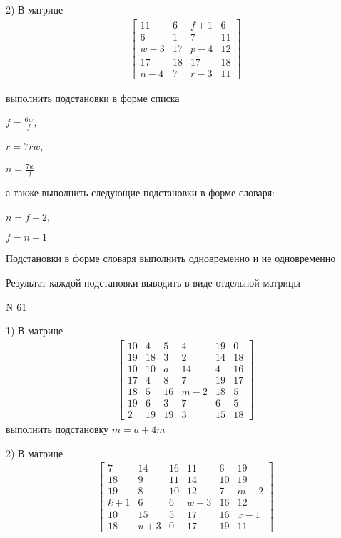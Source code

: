 \documentclass[11pt]{report}
\begin{document}
    2) В матрице
\begin{align*}
\left[\begin{matrix}11 & 6 & f + 1 & 6\\6 & 1 & 7 & 11\\w - 3 & 17 & p - 4 & 12\\17 & 18 & 17 & 18\\n - 4 & 7 & r - 3 & 11\end{matrix}\right]
\end{align*}

выполнить подстановки в форме списка

$f=\frac{6 w}{f}$,

$r=7 r w$,

$n=\frac{7 w}{f}$

а также выполнить следующие подстановки в форме словаря:

$n=f + 2$,

$f=n + 1$


    Подстановки в форме словаря выполнить одновременно и не одновременно


    Результат каждой подстановки выводить в виде отдельной матрицы

\newpage
N 61


    1) В матрице
\begin{align*}
\left[\begin{matrix}10 & 4 & 5 & 4 & 19 & 0\\19 & 18 & 3 & 2 & 14 & 18\\10 & 10 & a & 14 & 4 & 16\\17 & 4 & 8 & 7 & 19 & 17\\18 & 5 & 16 & m - 2 & 18 & 5\\19 & 6 & 3 & 7 & 6 & 5\\2 & 19 & 19 & 3 & 15 & 18\end{matrix}\right]
\end{align*}
выполнить подстановку $m=a + 4 m$


    2) В матрице
\begin{align*}
\left[\begin{matrix}7 & 14 & 16 & 11 & 6 & 19\\18 & 9 & 11 & 14 & 10 & 19\\19 & 8 & 10 & 12 & 7 & m - 2\\k + 1 & 6 & 6 & w - 3 & 16 & 12\\10 & 15 & 5 & 17 & 16 & x - 1\\18 & u + 3 & 0 & 17 & 19 & 11\end{matrix}\right]
\end{align*}
\end{document}
